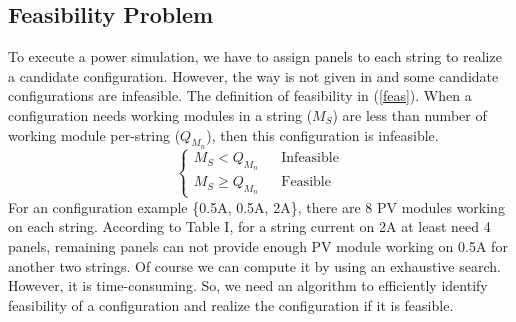 \documentclass[conference]{IEEEtran}
\begin{document}
\subsection{Feasibility Problem}\label{feasPro}
To execute a power simulation, we have to assign panels to each string to realize a candidate configuration. However, the way is not given in \cite{b10} and some candidate configurations are infeasible. 
The definition of feasibility in (\ref{feas}). When a configuration needs working modules in a string (\textit{$M_S$}) are less than number of working module per-string (\textit{$Q_{M_{n}}$}), then this configuration is infeasible. 
\begin{equation}
\left\{\begin{matrix}
M_S < Q_{M_{n}} & & \text{Infeasible}\\ 
M_S \geqslant Q_{M_{n}} & & \text{Feasible} 
\label{feas}
\end{matrix}\right. 
\end{equation}
For an configuration example \{0.5A, 0.5A, 2A\}, there are 8 PV modules working on each string. According to Table I, for a string current on 2A at least need 4 panels, remaining panels can not provide enough PV module working on 0.5A for another two strings. 
Of course we can compute it by using an exhaustive search. However, it is time-consuming. So, we need an algorithm to efficiently identify feasibility of a configuration and realize the configuration if it is feasible.




\end{document}
